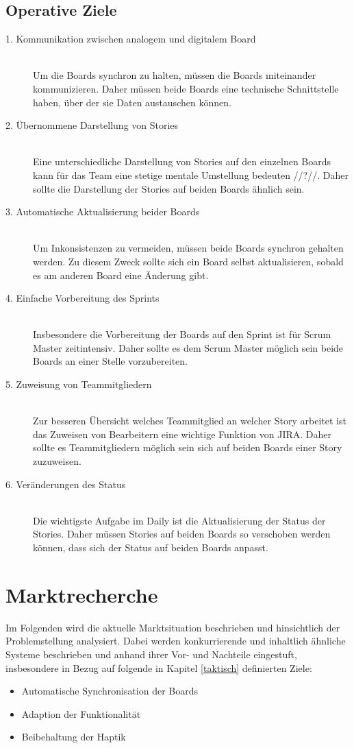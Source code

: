 \documentclass[12pt,titlepage]{scrartcl}
\begin{document}
		\subsection{Operative Ziele}
		\begin{description}
 			\item[1. Kommunikation zwischen analogem und digitalem Board] \hfill \\
 			Um die Boards synchron zu halten, müssen die Boards miteinander kommunizieren. Daher müssen beide Boards eine technische Schnittstelle haben, über der sie Daten austauschen können. 
 			\item[2. Übernommene Darstellung von Stories] \hfill \\
 			Eine unterschiedliche Darstellung von Stories auf den einzelnen Boards kann für das Team eine stetige mentale Umstellung bedeuten //?//. Daher sollte die Darstellung der Stories auf beiden Boards ähnlich sein.
 			\item[3. Automatische Aktualisierung beider Boards] \hfill \\
 			Um Inkonsistenzen zu vermeiden, müssen beide Boards synchron gehalten werden. Zu diesem Zweck sollte sich ein Board selbst aktualisieren, sobald es am anderen Board eine Änderung gibt.
 			\item[4. Einfache Vorbereitung des Sprints] \hfill \\
 			Insbesondere die Vorbereitung der Boards auf den Sprint ist für Scrum Master zeitintensiv. Daher sollte es dem Scrum Master möglich sein beide Boards an einer Stelle vorzubereiten.
 			\item[5. Zuweisung von Teammitgliedern] \hfill \\
 			Zur besseren Übersicht welches Teammitglied an welcher Story arbeitet ist das Zuweisen von Bearbeitern eine wichtige Funktion von JIRA. Daher sollte es Teammitgliedern möglich sein sich auf beiden Boards einer Story zuzuweisen.
 			\item[6. Veränderungen des Status] \hfill \\
 			Die wichtigste Aufgabe im Daily ist die Aktualisierung der Status der Stories. Daher müssen Stories auf beiden Boards so verschoben werden können, dass sich der Status auf beiden Boards anpasst.
		\end{description}
	\newpage	
	\section{Marktrecherche}
	Im Folgenden wird die aktuelle Marktsituation beschrieben und hinsichtlich der Problemstellung
analysiert. Dabei werden konkurrierende und inhaltlich ähnliche Systeme beschrieben und anhand ihrer Vor- und Nachteile eingestuft, insbesondere in Bezug auf folgende in Kapitel \ref{taktisch} definierten Ziele:
	\begin{itemize} 
		\item Automatische Synchronisation der Boards 
		\item Adaption der Funktionalität
		\item Beibehaltung der Haptik 
	\end{itemize}
\end{document}
